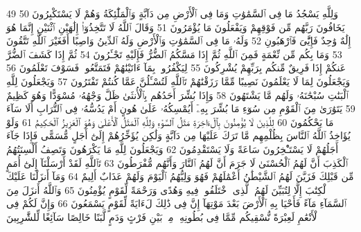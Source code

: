{\tiny\colorbox{cl_aya}{49}} وَلِلَّهِ يَسْجُدُ مَا فِى ٱلسَّمَٰوَٰتِ وَمَا فِى ٱلْأَرْضِ مِن دَآبَّةٍ وَٱلْمَلَٰٓئِكَةُ وَهُمْ لَا يَسْتَكْبِرُونَ
{\tiny\colorbox{cl_aya}{50}} يَخَافُونَ رَبَّهُم مِّن فَوْقِهِمْ وَيَفْعَلُونَ مَا يُؤْمَرُونَ
{\tiny\colorbox{cl_aya}{51}} وَقَالَ ٱللَّهُ لَا تَتَّخِذُوٓا۟ إِلَٰهَيْنِ ٱثْنَيْنِ إِنَّمَا هُوَ إِلَٰهٌ وَٰحِدٌ فَإِيَّٰىَ فَٱرْهَبُونِ
{\tiny\colorbox{cl_aya}{52}} وَلَهُۥ مَا فِى ٱلسَّمَٰوَٰتِ وَٱلْأَرْضِ وَلَهُ ٱلدِّينُ وَاصِبًا أَفَغَيْرَ ٱللَّهِ تَتَّقُونَ
{\tiny\colorbox{cl_aya}{53}} وَمَا بِكُم مِّن نِّعْمَةٍ فَمِنَ ٱللَّهِ ثُمَّ إِذَا مَسَّكُمُ ٱلضُّرُّ فَإِلَيْهِ تَجْـَٔرُونَ
{\tiny\colorbox{cl_aya}{54}} ثُمَّ إِذَا كَشَفَ ٱلضُّرَّ عَنكُمْ إِذَا فَرِيقٌ مِّنكُم بِرَبِّهِمْ يُشْرِكُونَ
{\tiny\colorbox{cl_aya}{55}} لِيَكْفُرُوا۟ بِمَآ ءَاتَيْنَٰهُمْ فَتَمَتَّعُوا۟ فَسَوْفَ تَعْلَمُونَ
{\tiny\colorbox{cl_aya}{56}} وَيَجْعَلُونَ لِمَا لَا يَعْلَمُونَ نَصِيبًا مِّمَّا رَزَقْنَٰهُمْ تَٱللَّهِ لَتُسْـَٔلُنَّ عَمَّا كُنتُمْ تَفْتَرُونَ
{\tiny\colorbox{cl_aya}{57}} وَيَجْعَلُونَ لِلَّهِ ٱلْبَنَٰتِ سُبْحَٰنَهُۥ وَلَهُم مَّا يَشْتَهُونَ
{\tiny\colorbox{cl_aya}{58}} وَإِذَا بُشِّرَ أَحَدُهُم بِٱلْأُنثَىٰ ظَلَّ وَجْهُهُۥ مُسْوَدًّا وَهُوَ كَظِيمٌ
{\tiny\colorbox{cl_aya}{59}} يَتَوَٰرَىٰ مِنَ ٱلْقَوْمِ مِن سُوٓءِ مَا بُشِّرَ بِهِۦٓ أَيُمْسِكُهُۥ عَلَىٰ هُونٍ أَمْ يَدُسُّهُۥ فِى ٱلتُّرَابِ أَلَا سَآءَ مَا يَحْكُمُونَ
{\tiny\colorbox{cl_aya}{60}} لِلَّذِينَ لَا يُؤْمِنُونَ بِٱلْءَاخِرَةِ مَثَلُ ٱلسَّوْءِ وَلِلَّهِ ٱلْمَثَلُ ٱلْأَعْلَىٰ وَهُوَ ٱلْعَزِيزُ ٱلْحَكِيمُ
{\tiny\colorbox{cl_aya}{61}} وَلَوْ يُؤَاخِذُ ٱللَّهُ ٱلنَّاسَ بِظُلْمِهِم مَّا تَرَكَ عَلَيْهَا مِن دَآبَّةٍ وَلَٰكِن يُؤَخِّرُهُمْ إِلَىٰٓ أَجَلٍ مُّسَمًّى فَإِذَا جَآءَ أَجَلُهُمْ لَا يَسْتَـْٔخِرُونَ سَاعَةً وَلَا يَسْتَقْدِمُونَ
{\tiny\colorbox{cl_aya}{62}} وَيَجْعَلُونَ لِلَّهِ مَا يَكْرَهُونَ وَتَصِفُ أَلْسِنَتُهُمُ ٱلْكَذِبَ أَنَّ لَهُمُ ٱلْحُسْنَىٰ لَا جَرَمَ أَنَّ لَهُمُ ٱلنَّارَ وَأَنَّهُم مُّفْرَطُونَ
{\tiny\colorbox{cl_aya}{63}} تَٱللَّهِ لَقَدْ أَرْسَلْنَآ إِلَىٰٓ أُمَمٍ مِّن قَبْلِكَ فَزَيَّنَ لَهُمُ ٱلشَّيْطَٰنُ أَعْمَٰلَهُمْ فَهُوَ وَلِيُّهُمُ ٱلْيَوْمَ وَلَهُمْ عَذَابٌ أَلِيمٌ
{\tiny\colorbox{cl_aya}{64}} وَمَآ أَنزَلْنَا عَلَيْكَ ٱلْكِتَٰبَ إِلَّا لِتُبَيِّنَ لَهُمُ ٱلَّذِى ٱخْتَلَفُوا۟ فِيهِ وَهُدًى وَرَحْمَةً لِّقَوْمٍ يُؤْمِنُونَ
{\tiny\colorbox{cl_aya}{65}} وَٱللَّهُ أَنزَلَ مِنَ ٱلسَّمَآءِ مَآءً فَأَحْيَا بِهِ ٱلْأَرْضَ بَعْدَ مَوْتِهَآ إِنَّ فِى ذَٰلِكَ لَءَايَةً لِّقَوْمٍ يَسْمَعُونَ
{\tiny\colorbox{cl_aya}{66}} وَإِنَّ لَكُمْ فِى ٱلْأَنْعَٰمِ لَعِبْرَةً نُّسْقِيكُم مِّمَّا فِى بُطُونِهِۦ مِنۢ بَيْنِ فَرْثٍ وَدَمٍ لَّبَنًا خَالِصًا سَآئِغًا لِّلشَّٰرِبِينَ
